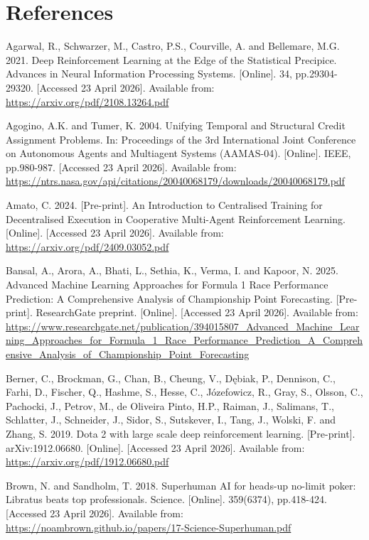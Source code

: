 \chapter*{References}
\begingroup
\sloppy

Agarwal, R., Schwarzer, M., Castro, P.S., Courville, A. and Bellemare, M.G. 2021. Deep Reinforcement Learning at the Edge of the Statistical Precipice. Advances in Neural Information Processing Systems. [Online]. 34, pp.29304-29320. [Accessed 23 April 2026]. Available from: \url{https://arxiv.org/pdf/2108.13264.pdf}

Agogino, A.K. and Tumer, K. 2004. Unifying Temporal and Structural Credit Assignment Problems. In: Proceedings of the 3rd International Joint Conference on Autonomous Agents and Multiagent Systems (AAMAS-04). [Online]. IEEE, pp.980-987. [Accessed 23 April 2026]. Available from: \url{https://ntrs.nasa.gov/api/citations/20040068179/downloads/20040068179.pdf}

Amato, C. 2024. [Pre-print]. An Introduction to Centralised Training for Decentralised Execution in Cooperative Multi-Agent Reinforcement Learning. [Online]. [Accessed 23 April 2026]. Available from: \url{https://arxiv.org/pdf/2409.03052.pdf}

Bansal, A., Arora, A., Bhati, L., Sethia, K., Verma, I. and Kapoor, N. 2025. Advanced Machine Learning Approaches for Formula 1 Race Performance Prediction: A Comprehensive Analysis of Championship Point Forecasting. [Pre-print]. ResearchGate preprint. [Online]. [Accessed 23 April 2026]. Available from: \url{https://www.researchgate.net/publication/394015807_Advanced_Machine_Learning_Approaches_for_Formula_1_Race_Performance_Prediction_A_Comprehensive_Analysis_of_Championship_Point_Forecasting}

Berner, C., Brockman, G., Chan, B., Cheung, V., D{\k{e}}biak, P., Dennison, C., Farhi, D., Fischer, Q., Hashme, S., Hesse, C., J{\'o}zefowicz, R., Gray, S., Olsson, C., Pachocki, J., Petrov, M., de Oliveira Pinto, H.P., Raiman, J., Salimans, T., Schlatter, J., Schneider, J., Sidor, S., Sutskever, I., Tang, J., Wolski, F. and Zhang, S. 2019. Dota 2 with large scale deep reinforcement learning. [Pre-print]. arXiv:1912.06680. [Online]. [Accessed 23 April 2026]. Available from: \url{https://arxiv.org/pdf/1912.06680.pdf}

Brown, N. and Sandholm, T. 2018. Superhuman {AI} for heads-up no-limit poker: {Libratus} beats top professionals. Science. [Online]. 359(6374), pp.418-424. [Accessed 23 April 2026]. Available from: \url{https://noambrown.github.io/papers/17-Science-Superhuman.pdf}

